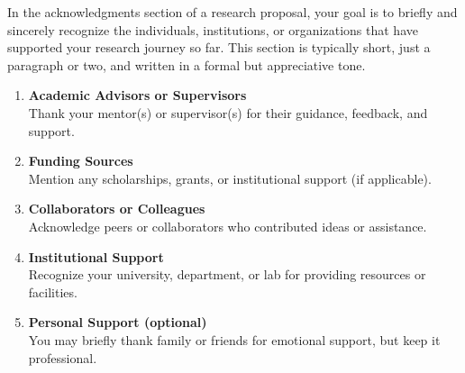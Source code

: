 \documentclass[PCOM,Proposal,Review]{mpThesis}
\newcommand{\Hd}[1]{{\color{SteelBlue}\bf#1}}
\begin{document}
\begin{FrontMatter}[FigLs=true,TabLs=true,AlgoLs=false,AbbreLs=true]
\begin{Remark}
In the acknowledgments section of a research proposal, your goal is to briefly and sincerely recognize
the individuals, institutions, or organizations that have supported your research journey so far.
This section is typically short, just a paragraph or two, and written in a formal but appreciative tone.
\begin{enumerate}
\item \Hd{Academic Advisors or Supervisors} \\
Thank your mentor(s) or supervisor(s) for their guidance, feedback, and support.

\item \Hd{Funding Sources} \\
Mention any scholarships, grants, or institutional support (if applicable).

\item \Hd{Collaborators or Colleagues} \\
Acknowledge peers or collaborators who contributed ideas or assistance.

\item \Hd{Institutional Support} \\
Recognize your university, department, or lab for providing resources or facilities.

\item \Hd{Personal Support (optional)} \\
You may briefly thank family or friends for emotional support, but keep it professional.
\end{enumerate}
\end{Remark}

\end{FrontMatter}
\end{document}
